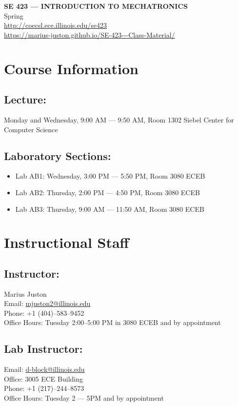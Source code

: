 \documentclass[11pt]{article}
\begin{document}
%
\begin{center}
    {\Large \textbf{SE 423 --- INTRODUCTION TO MECHATRONICS}}\\
    \vspace{0.2cm}
    Spring \Year\\
    \vspace{0.2cm}
    \url{http://coecsl.ece.illinois.edu/se423} \\\url{https://marius-juston.github.io/SE-423---Class-Material/}
\end{center}
%
\vspace{0.5cm}

\section*{Course Information}

\subsection*{Lecture:}
Monday and Wednesday, 9:00 AM --- 9:50 AM, Room 1302 Siebel Center for Computer Science

\subsection*{Laboratory Sections:}
\begin{itemize}
    \item Lab AB1: Wednesday, 3:00 PM --- 5:50 PM, Room 3080 ECEB
    \item Lab AB2: Thursday, 2:00 PM --- 4:50 PM, Room 3080 ECEB
    \item Lab AB3: Thursday, 9:00 AM --- 11:50 AM, Room 3080 ECEB
\end{itemize}
%
\section*{Instructional Staff}

\subsection*{Instructor:}
Marius Juston \\
Email: \href{mailto:mjuston2@illinois.edu}{mjuston2@illinois.edu}\\
Phone: +1 (404)--583--9452\\
Office Hours: Tuesday 2:00--5:00 PM in 3080 ECEB and by appointment

\subsection*{Lab Instructor:}
Email: \href{mailto:d-block@illinois.edu}{d-block@illinois.edu}\\
Office: 3005 ECE Building\\
Phone: +1 (217)--244--8573\\
Office Hours: Tuesday 2 --- 5PM and by appointment
\end{document}
